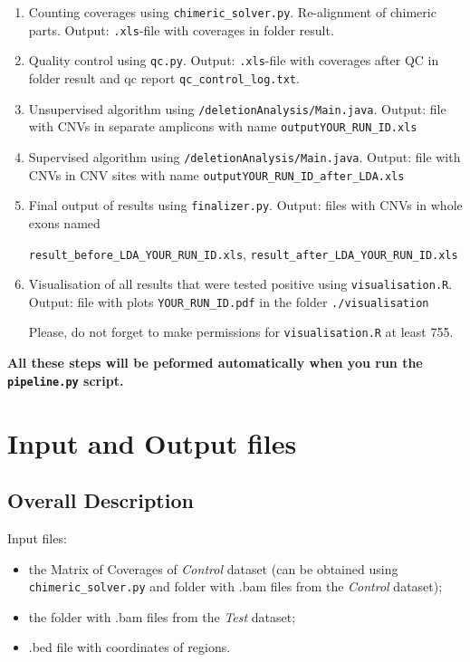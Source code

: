 \documentclass{article}
\begin{document}
\begin{enumerate}
\item Counting coverages using \texttt{chimeric\_solver.py}. Re-alignment of chimeric parts.
     Output: \texttt{.xls}-file with coverages in folder result.
\item Quality control using \texttt{qc.py}.
     Output: \texttt{.xls}-file with coverages after QC in folder result and qc report \texttt{qc\_control\_log.txt}.
\item Unsupervised algorithm using \texttt{/deletionAnalysis/Main.java}.
     Output: file with CNVs in separate amplicons with name
         \texttt{outputYOUR\_RUN\_ID.xls}
\item Supervised algorithm using \texttt{/deletionAnalysis/Main.java}.
     Output: file with CNVs in CNV sites  with name
         \texttt{outputYOUR\_RUN\_ID\_after\_LDA.xls}
\item Final output of results using \texttt{finalizer.py}.
      Output: files with CNVs in whole exons named
      
      \texttt{result\_before\_LDA\_YOUR\_RUN\_ID.xls}, 
      \texttt{result\_after\_LDA\_YOUR\_RUN\_ID.xls}
      
 \item Visualisation of all results that were tested positive using \texttt{visualisation.R}.
      Output: file with plots \texttt{YOUR\_RUN\_ID.pdf} in the folder \texttt{./visualisation}
      
      Please, do not forget to make permissions for \texttt{visualisation.R} at least 755.
\end{enumerate}

{\bf All these steps will be peformed automatically when you run the \texttt{pipeline.py} script.}

\newpage

\section{Input and Output files}

\subsection{Overall Description}

{\Large Input files:}
\begin{itemize}
\item the Matrix of Coverages of {\it Control} dataset (can be obtained using \texttt{chimeric\_solver.py} and folder with .bam files from the {\it Control} dataset);
\item the folder with .bam files from the {\it Test} dataset;
\item .bed file with coordinates of regions.
\end{itemize}
\end{document}
